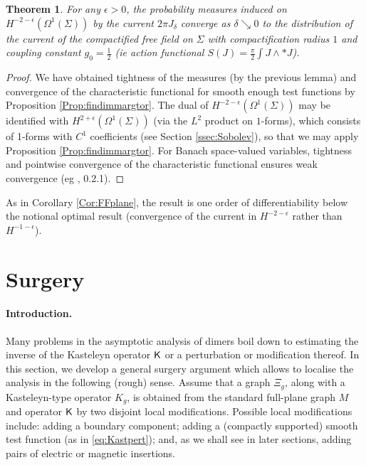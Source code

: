 \documentclass[10pt]{article}
\newcommand{\rK}{{\sf K}}
\newtheorem{Thm}[thm]{Theorem}
\begin{document}
\begin{Thm}\label{Thm:toruscompact}
For any $\epsilon>0$, the probability measures induced on $H^{-2-\epsilon}(\Omega^1(\Sigma))$ by the current $2\pi J_\delta$ converge as $\delta\searrow 0$ to the distribution of the current of the compactified free field on $\Sigma$ with compactification radius $1$ and coupling constant $g_0=\frac 12$ (ie action functional $S(J)=\frac \pi 2\int J\wedge\ast J$).
\end{Thm}
\begin{proof}
We have obtained tightness of the measures (by the previous lemma) and convergence of the characteristic functional for smooth enough test functions by Proposition \ref{Prop:findimmargtor}. The dual of $H^{-2-\epsilon}(\Omega^1(\Sigma))$ may be identified with $H^{2+\epsilon}(\Omega^1(\Sigma))$ (via the $L^2$ product on $1$-forms), which consists of 1-forms with $C^1$ coefficients (see Section \ref{ssec:Sobolev}), so that we may apply Proposition \ref{Prop:findimmargtor}. %
For Banach space-valued variables, tightness and pointwise convergence of the characteristic functional ensures weak convergence (eg \cite{Ledoux_Talagrand}, 0.2.1).
\end{proof}

As in Corollary \ref{Cor:FFplane}, the result is one order of differentiability below the notional optimal result (convergence of the current in $H^{-2-\epsilon}$ rather than $H^{-1-\epsilon}$).



\section{Surgery}\label{Sec:surgery}

\paragraph{Introduction.}
Many problems in the asymptotic analysis of dimers boil down to estimating the inverse of the Kasteleyn operator $\rK$ or a perturbation or modification thereof. In this section, we develop a general surgery argument which allows to localise the analysis in the following (rough) sense. Assume that a graph $\Xi_g$, along with a Kasteleyn-type operator $K_g$, is obtained from the standard full-plane graph $M$ and operator $\rK$ by two disjoint local modifications. Possible local modifications include: adding a boundary component; adding a (compactly supported) smooth test function (as in \eqref{eq:Kastpert}); and, as we shall see in later sections, adding pairs of electric or magnetic insertions.
\end{document}
